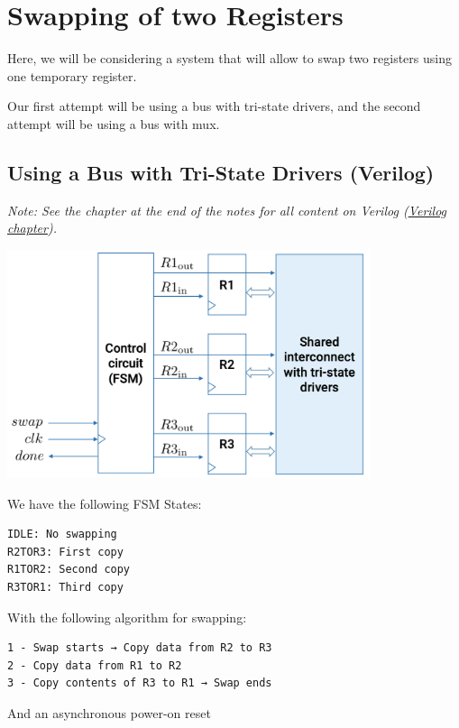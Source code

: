 \documentclass[12pt,openany]{book}
\begin{document}
\section{Swapping of two Registers}
Here, we will be considering a system that will allow to swap two registers using one temporary register.

Our first attempt will be using a bus with tri-state drivers, and the second attempt will be using a bus with mux.
\subsection{Using a Bus with Tri-State Drivers (Verilog)}
 \textit{Note: See the chapter at the end of the notes for all content on Verilog (\hyperref[Verilog]{Verilog chapter}).}


\begin{minipage}[htp]{0.6\textwidth}
	\begin{center}
		\includegraphics[width=0.8\textwidth]{circuits/18.1.1.png}
	\end{center}
\end{minipage}
\hfill
\vline
\hfill
\begin{minipage}[htp]{0.3\textwidth}
We have the following FSM States:
\begin{verbatim}
IDLE: No swapping
R2TOR3: First copy
R1TOR2: Second copy
R3TOR1: Third copy
\end{verbatim}	
\end{minipage}
\newline
With the following algorithm for swapping:
\begin{verbatim}
1 - Swap starts → Copy data from R2 to R3
2 - Copy data from R1 to R2
3 - Copy contents of R3 to R1 → Swap ends
\end{verbatim}
And an asynchronous power-on reset
\end{document}
